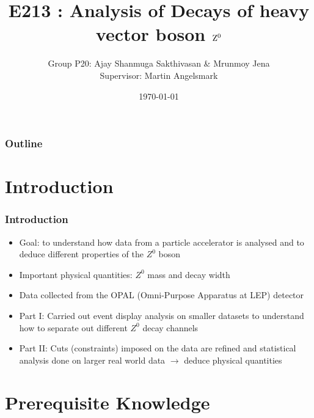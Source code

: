 \documentclass[10pt]{beamer}
\title[E213 : Analysis of Decays of heavy vector boson $\rm Z^{0}$] %
{E213 : Analysis of Decays of heavy vector boson $\rm Z^{0}$}
\author[Sakthivasan, Jena] %
{Group P20: Ajay Shanmuga Sakthivasan \& Mrunmoy Jena\\
Supervisor: Martin Angelsmark}
\date{\today}
\begin{document}
\begin{frame}
    \titlepage 
\end{frame}

\begin{frame}
    \frametitle{Outline}
    \tableofcontents
\end{frame}

\section{Introduction}
\begin{frame}
\frametitle{Introduction}
\begin{itemize}
\item Goal: to understand how data from a particle accelerator is analysed and to deduce different properties of the $Z^0$ boson
\item Important physical quantities: $Z^0$ mass and decay width 
\item Data collected from the OPAL (Omni-Purpose Apparatus at LEP) detector
\item Part I: Carried out event display analysis on smaller datasets to understand how to separate out different $Z^0$ decay channels
\item Part II: Cuts (constraints) imposed on the data are refined and statistical analysis done on larger real world data $\rightarrow$ deduce physical quantities
\end{itemize}
\end{frame}
\section{Prerequisite Knowledge}
\end{document}
